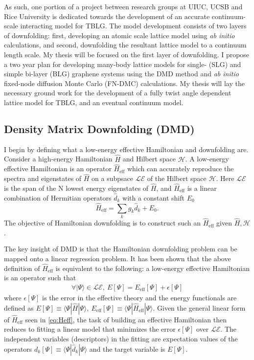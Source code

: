 \documentclass[12pt]{article}
\begin{document}
As such, one portion of a project between research groups at UIUC, UCSB and Rice University is dedicated towards the development of an accurate continuum-scale interacting model for TBLG.
The model development consists of two layers of downfolding: first, developing an atomic scale lattice model using \textit{ab initio} calculations, and second, downfolding the resultant lattice model to a continuum length scale.
My thesis will be focused on the first layer of downfolding.
I propose a two year plan for developing many-body lattice models for single- (SLG) and simple bi-layer (BLG) graphene systems using the DMD method and \textit{ab initio} fixed-node diffusion Monte Carlo (FN-DMC) calculations.
My thesis will lay the necessary ground work for the development of a fully twist angle dependent lattice model for TBLG, and an eventual continuum model.

\subsection{Density Matrix Downfolding (DMD)}
I begin by defining what a low-energy effective Hamiltonian and downfolding are.
Consider a high-energy Hamiltonian $\hat{H}$ and Hilbert space $\mathcal{H}$.
A low-energy effective Hamiltonian is an operator $\hat{H}_\text{eff}$ which can accurately reproduce the spectra and eigenstates of $\hat{H}$ on a subpsace $\mathcal{LE}$ of the Hilbert space $\mathcal{H}$.
Here $\mathcal{LE}$ is the span of the N lowest energy eigenstates of $\hat{H}$, and $\hat{H}_\text{eff}$ is a linear combination of Hermitian operators $\hat{d}_k$ with a constant shift $E_0$
\begin{equation}
\hat{H}_\text{eff} = \sum_{k} g_k \hat{d}_k  + E_0.
\label{eq:Heff}
\end{equation}
The objective of Hamiltonian downfolding is to construct such an $\hat{H}_\text{eff}$ given $\hat{H}, \mathcal{H}$.

The key insight of DMD is that the Hamiltonian downfolding problem can be mapped onto a linear regression problem.
It has been shown \cite{Zheng2017} that the above definition of $\hat{H}_\text{eff}$ is equivalent to the following: a low-energy effective Hamiltonian is an operator such that 
\begin{equation}
\begin{split}
\forall |\Psi\rangle \in \mathcal{LE},\ E[\Psi] = E_\text{eff}[\Psi]  + \epsilon[\Psi]
\end{split}
\label{eq:DMD}
\end{equation}
where $\epsilon[\Psi]$ is the error in the effective theory and the energy functionals are defined as $E[\Psi] \equiv \langle \Psi | \hat{H} |\Psi \rangle,\  E_\text{eff}[\Psi] \equiv \langle \Psi | \hat{H}_\text{eff} |\Psi \rangle$.
Given the general linear form of $\hat{H}_\text{eff}$ seen in \eqref{eq:Heff}, 
the task of building an effective Hamiltonian then reduces to fitting a linear model that minimizes the error $\epsilon[\Psi]$ over $\mathcal{LE}$.
The independent variables (descriptors) in the fitting are expectation values of the operators $d_k[\Psi] \equiv \langle \Psi |\hat{d}_k|\Psi \rangle$ and the target variable is $E[\Psi]$.
\end{document}
